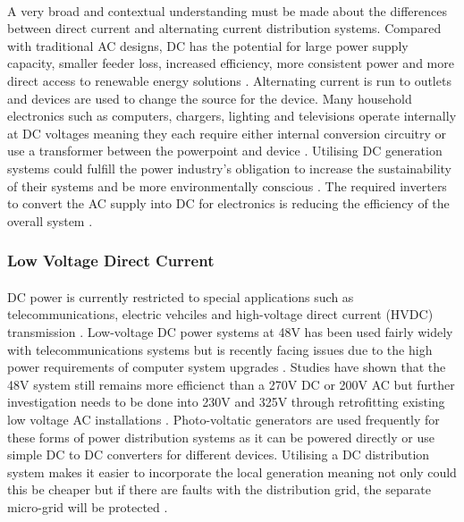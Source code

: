 \paragraph{}
A very broad and contextual understanding must be made about the differences between direct current and alternating current distribution systems. Compared with traditional AC designs, DC has the potential for large power supply capacity, smaller feeder loss, increased efficiency, more consistent power and more direct access to renewable energy solutions \cite{Liu2014}. Alternating current is run to outlets and devices are used to change the source for the device. Many household electronics such as computers, chargers, lighting and televisions operate internally at DC voltages meaning they each require either internal conversion circuitry or use a transformer between the powerpoint and device \cite{Paajanen2009}. Utilising DC generation systems could fulfill the power industry's obligation to increase the sustainability of their systems and be more environmentally conscious \cite{Starke2008a}. The required inverters to convert the AC supply into DC for electronics is reducing the efficiency of the overall system \cite{Starke2008b}.       

\subsubsection{Low Voltage Direct Current}

\paragraph{}
DC power is currently restricted to special applications such as telecommunications, electric vehciles and high-voltage direct current (HVDC) transmission \cite{Salomonsson2007}. Low-voltage DC power systems at 48V has been used fairly widely with telecommunications systems but is recently facing issues due to the high power requirements of computer system upgrades \cite{Salomonsson2007}. Studies have shown that the 48V system still remains more efficienct than a 270V DC or 200V AC but further investigation needs to be done into 230V and 325V through retrofitting existing low voltage AC installations \cite{Salomonsson2007}. Photo-voltatic generators are used frequently for these forms of power distribution systems as it can be powered directly or use simple DC to DC converters for different devices. Utilising a DC distribution system makes it easier to incorporate the local generation meaning not only could this be cheaper but if there are faults with the distribution grid, the separate micro-grid will be protected \cite{Starke2008a}. 

